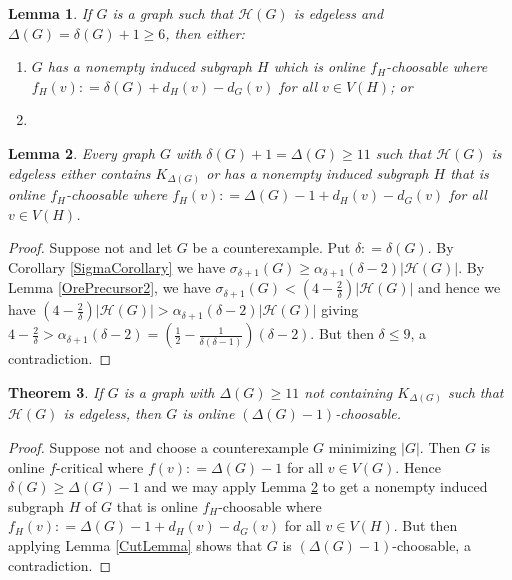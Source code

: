\documentclass[12pt]{article}
\theoremstyle{plain}
\newtheorem{thm}{Theorem}[section]
\newtheorem{lem}[thm]{Lemma}
\theoremstyle{definition}
\theoremstyle{remark}
\newcommand{\fancy}[1]{\mathcal{#1}}
\newcommand{\HH}{\fancy{H}}
\newcommand{\card}[1]{\left|#1\right|}
\newcommand{\parens}[1]{\left( #1 \right)}
\newcommand{\DefinedAs}{\mathrel{\mathop:}=}
\begin{document}
\begin{lem}\label{OrePrecursorX}
If $G$ is a graph such that $\HH(G)$ is edgeless and $\Delta(G) = \delta(G) + 1 \geq 6$, then either:
\begin{enumerate}
\item $G$ has a nonempty induced subgraph $H$ which is online $f_H$-choosable where $f_H(v) \DefinedAs \delta(G) + d_H(v) - d_G(v)$ for all $v \in V(H)$; or
\item 
\end{enumerate}
\end{lem}

\begin{lem}\label{EdgelessEuler}
Every graph $G$ with $\delta(G) + 1 = \Delta(G) \geq 11$ such that $\HH(G)$ is edgeless either contains $K_{\Delta(G)}$ or has a nonempty induced subgraph $H$ that is online $f_H$-choosable where $f_H(v) \DefinedAs \Delta(G) - 1 + d_H(v) - d_G(v)$ for all $v \in V(H)$.
\end{lem}
\begin{proof}
Suppose not and let $G$ be a counterexample.  Put $\delta \DefinedAs \delta(G)$. By Corollary \ref{SigmaCorollary} we have $\sigma_{\delta + 1}(G) \geq \alpha_{\delta+1}(\delta-2)\card{\HH(G)}$.  By Lemma \ref{OrePrecursor2}, we have $\sigma_{\delta + 1}(G) < \parens{4 - \frac{2}{\delta}}\card{\HH(G)}$ and hence we have $(4 - \frac{2}{\delta})\card{\HH(G)} > \alpha_{\delta + 1}(\delta - 2)\card{\HH(G)}$ giving $4 - \frac{2}{\delta} > \alpha_{\delta+1}(\delta-2) = \parens{\frac12 - \frac{1}{\delta(\delta-1)}}\parens{\delta-2}$.  But then $\delta \leq 9$, a contradiction.
\end{proof}

\begin{thm}\label{EdgelessOnlineEuler}
If $G$ is a graph with $\Delta(G) \geq 11$ not containing $K_{\Delta(G)}$ such that $\HH(G)$ is edgeless, then $G$ is online $(\Delta(G)-1)$-choosable.
\end{thm}
\begin{proof}
Suppose not and choose a counterexample $G$ minimizing $\card{G}$. Then $G$ is online $f$-critical where $f(v) \DefinedAs \Delta(G) - 1$ for all $v \in V(G)$.  Hence $\delta(G) \geq \Delta(G) - 1$ and we may apply Lemma \ref{EdgelessEuler} to get a nonempty induced subgraph $H$ of $G$ that is online $f_H$-choosable where $f_H(v) \DefinedAs \Delta(G) - 1 + d_H(v) - d_G(v)$ for all $v \in V(H)$.  But then applying Lemma \ref{CutLemma} shows that $G$ is $(\Delta(G)-1)$-choosable, a contradiction.
\end{proof}
\end{document}
